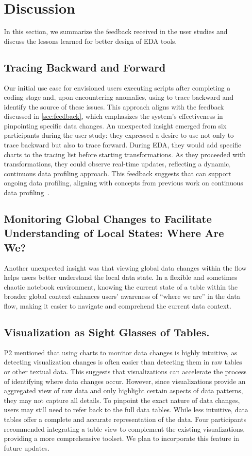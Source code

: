 \section{Discussion}
In this section, we summarize the feedback received in the user studies and discuss the lessons learned for better design of EDA tools.

\subsection{Tracing Backward and Forward}
Our initial use case for \system{} envisioned users executing scripts after completing a coding stage and, upon encountering anomalies, using \system{} to trace backward and identify the source of these issues. This approach aligns with the feedback discussed in \autoref{sec:feedback}, which emphasizes the system's effectiveness in pinpointing specific data changes.
An unexpected insight emerged from six participants during the user study: they expressed a desire to use \system{} not only to trace backward but also to trace forward. During EDA, they would add specific charts to the tracing list before starting transformations. As they proceeded with transformations, they could observe real-time updates, reflecting a dynamic, continuous data profiling approach. This feedback suggests that \system{} can support ongoing data profiling, aligning with concepts from previous work on continuous data profiling~\cite{autoprofiler}.


\subsection{Monitoring Global Changes to Facilitate Understanding of Local States: Where Are We?}
Another unexpected insight was that viewing global data changes within the flow helps users better understand the local data state. In a flexible and sometimes chaotic notebook environment, knowing the current state of a table within the broader global context enhances users' awareness of ``where we are'' in the data flow, making it easier to navigate and comprehend the current data context.

\subsection{Visualization as Sight Glasses of Tables.}
P2 mentioned that using charts to monitor data changes is highly intuitive, as detecting visualization changes is often easier than detecting them in raw tables or other textual data. This suggests that visualizations can accelerate the process of identifying where data changes occur. However, since visualizations provide an aggregated view of raw data and only highlight certain aspects of data patterns, they may not capture all details. To pinpoint the exact nature of data changes, users may still need to refer back to the full data tables. 
While less intuitive, data tables offer a complete and accurate representation of the data. Four participants recommended integrating a table view to complement the existing visualizations, providing a more comprehensive toolset. We plan to incorporate this feature in future updates.


